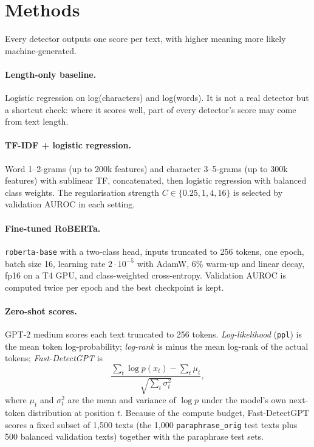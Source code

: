 \documentclass[11pt,a4paper]{article}
\begin{document}
\section{Methods}\label{sec:methods}

Every detector outputs one score per text, with higher meaning more likely machine-generated.

\paragraph{Length-only baseline.} Logistic regression on log(characters) and log(words). It is not a real detector
but a shortcut check: where it scores well, part of every detector's score may come from text length.

\paragraph{TF-IDF + logistic regression.} Word 1--2-grams (up to 200k features) and character 3--5-grams (up to 300k
features) with sublinear TF, concatenated, then logistic regression with balanced class weights. The regularisation
strength $C \in \{0.25, 1, 4, 16\}$ is selected by validation AUROC in each setting.

\paragraph{Fine-tuned RoBERTa.} \texttt{roberta-base} with a two-class head, inputs truncated to 256 tokens, one epoch,
batch size 16, learning rate $2\cdot10^{-5}$ with AdamW, 6\% warm-up and linear decay, fp16 on a T4 GPU, and
class-weighted cross-entropy. Validation AUROC is computed twice per epoch and the best checkpoint is kept.

\paragraph{Zero-shot scores.} GPT-2 medium scores each text truncated to 256 tokens.
\emph{Log-likelihood} (\texttt{ppl}) is the mean token log-probability; \emph{log-rank} is minus the mean log-rank of
the actual tokens; \emph{Fast-DetectGPT} \citep{bao24} is
\[
  \frac{\sum_t \log p(x_t) - \sum_t \mu_t}{\sqrt{\sum_t \sigma_t^2}},
\]
where $\mu_t$ and $\sigma_t^2$ are the mean and variance of $\log p$ under the model's own next-token distribution at
position $t$. Because of the compute budget, Fast-DetectGPT scores a fixed subset of 1,500 texts (the 1,000
\texttt{paraphrase\_orig} test texts plus 500 balanced validation texts) together with the paraphrase test sets.
\end{document}
